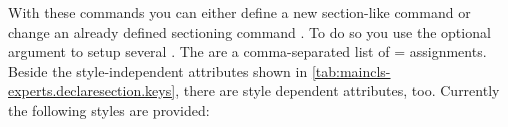 

\begin{Declaration}
\end{Declaration}
With these commands you can either define a new section-like
command  or change an already defined sectioning command
. To do so you use the optional argument to setup several
. The  are a comma-separated list of
= assignments. Beside the style-independent attributes
shown in \autoref{tab:maincls-experts.declaresection.keys}, there are style
dependent attributes, too. Currently the following styles are provided:
